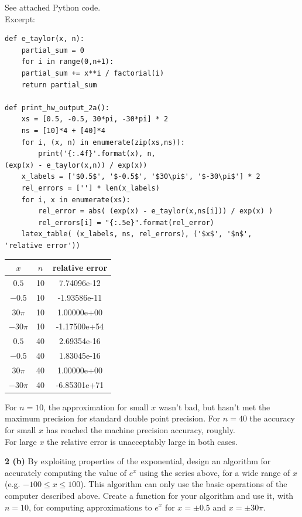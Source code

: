\documentclass[12pt]{article}
\begin{document}
	See attached Python code. \\
	Excerpt: \\
	
	\begin{lstlisting}
def e_taylor(x, n):
	partial_sum = 0
	for i in range(0,n+1):
	partial_sum += x**i / factorial(i)
	return partial_sum
	
def print_hw_output_2a():
	xs = [0.5, -0.5, 30*pi, -30*pi] * 2
	ns = [10]*4 + [40]*4
	for i, (x, n) in enumerate(zip(xs,ns)):
		print('{:.4f}'.format(x), n, 
(exp(x) - e_taylor(x,n)) / exp(x))
	x_labels = ['$0.5$', '$-0.5$', '$30\pi$', '$-30\pi$'] * 2
	rel_errors = [''] * len(x_labels)
	for i, x in enumerate(xs):
		rel_error = abs( (exp(x) - e_taylor(x,ns[i])) / exp(x) )
		rel_errors[i] = "{:.5e}".format(rel_error)
	latex_table( (x_labels, ns, rel_errors), ('$x$', '$n$', 
'relative error'))
	\end{lstlisting}

	\begin{center}
		\begin{tabular}{|c|c|c|}
			\hline
			$x$ & $n$ & relative error \\ \hline
			$0.5$ & 10 & 7.74096e-12 \\ \hline
			$-0.5$ & 10 & -1.93586e-11 \\ \hline
			$30\pi$ & 10 & 1.00000e+00 \\ \hline
			$-30\pi$ & 10 & -1.17500e+54 \\ \hline
			$0.5$ & 40 & 2.69354e-16 \\ \hline
			$-0.5$ & 40 & 1.83045e-16 \\ \hline
			$30\pi$ & 40 & 1.00000e+00 \\ \hline
			$-30\pi$ & 40 & -6.85301e+71 \\ \hline
		\end{tabular}
	\end{center}
	
	For $n=10$, the approximation for small $x$ wasn't bad, but hasn't met the maximum precision for standard double point precision. For $n=40$ the accuracy for small $x$ has reached the machine precision accuracy, roughly. \\
	For large $x$ the relative error is unacceptably large in both cases. \bigbreak
	
\hspace{-7 ex}\textbf{2 (b)} By exploiting properties of the exponential, design an algorithm for accurately computing the value of $e^x$ using the series above, for a wide range of $x$ (e.g. $−100 \leq x \leq 100$). This algorithm can only use the basic operations of the computer described above. Create a function for your algorithm and use it, with $n = 10$, for computing approximations to $e^x$ for $x = \pm0.5$ and $x = \pm 30\pi$. \bigbreak
\end{document}
